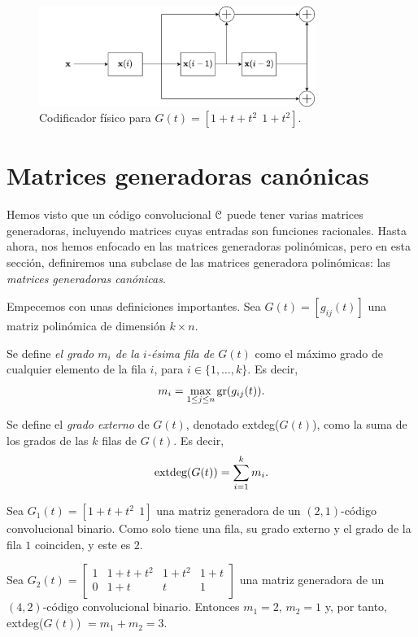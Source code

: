 \begin{figure}[h]
    \centering
    \includegraphics[width=0.8\textwidth]{img/codfisico.png}
    \caption{Codificador físico para $G(t) = \left[ 1 + t + t^2 \ \ 1 + t^2 \right]$.}
    \label{fig:encoder}
\end{figure}

\section{Matrices generadoras canónicas}

Hemos visto que un código convolucional $\mathcal C$ puede tener varias matrices generadoras, incluyendo matrices cuyas entradas son funciones racionales. Hasta ahora, nos hemos enfocado en las matrices generadoras polinómicas, pero en esta sección, definiremos una subclase de las matrices generadora polinómicas: las \emph{matrices generadoras canónicas}.


Empecemos con unas definiciones importantes. Sea $G(t) = [g_{ij}(t)]$ una matriz polinómica de dimensión $k\times n$.

\begin{definicion}
 Se define \emph{el grado $m_i$ de la $i$-ésima fila de $G(t)$}  como el máximo grado de cualquier elemento de la fila $i$, para $i \in \{1,\dots,k\}$. Es decir,
$$m_i = \max_{1 \leq j \leq n} \operatorname{gr}(g_{ij}(t)).$$
\end{definicion}

\begin{definicion}
Se define el \emph{grado externo} de $G(t)$, denotado extdeg($G(t)$), como la suma de los grados de las $k$ filas de $G(t)$. Es decir,
$$\textnormal{extdeg}(G(t)) = \sum_{i=1}^{k} m_i.$$
\end{definicion}

\begin{ejemplo}
\label{ej:cc}
Sea $G_1(t) = \left[1 + t + t^2 \ \ 1 \right]$ una matriz generadora de un $(2,1)$-código convolucional binario. Como solo tiene una fila, su grado externo y el grado de la fila $1$ coinciden, y este es $2$.


Sea $G_2(t) = \left[ \begin{array}{cccc}
    1 & 1 + t + t^2 & 1 + t^2 & 1 + t \\
    0 & 1 + t & t & 1 \\
\end{array} \right]$ una matriz generadora de un $(4,2)$-código convolucional binario. Entonces $m_1 = 2$, $m_2 = 1$ y, por tanto, extdeg($G(t)$) $ = m_1 + m_2 = 3$. 
\end{ejemplo}

